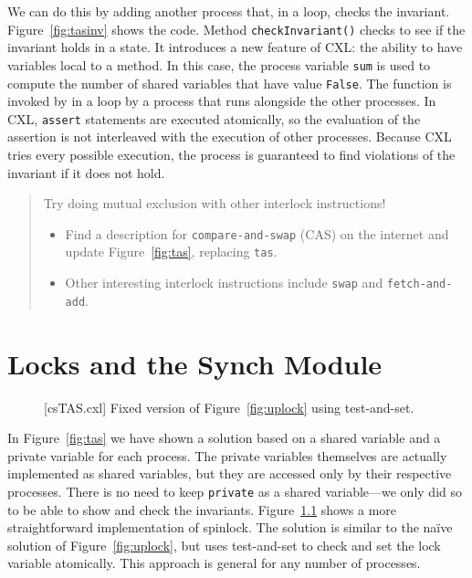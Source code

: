 \documentclass{report}
\newenvironment{code}{
\tcolorbox
}{
\endtcolorbox
}
\begin{document}
We can do this by adding another process that, in a loop,
checks the invariant.  Figure~\ref{fig:tasinv} shows the code.
Method \texttt{checkInvariant()} checks to see if the invariant holds
in a state.  It introduces a new feature of CXL: the ability to have
variables local to a method.  In this case, the process variable \texttt{sum}
is used to compute the number of shared variables that have value
\texttt{False}.
The function is invoked by in a loop by a process that runs alongside
the other processes.
In CXL, \texttt{assert} statements are executed atomically, so the
evaluation of the assertion is not interleaved with the execution
of other processes.
Because CXL tries every possible execution, the process is guaranteed
to find violations of the invariant if it does not hold.

\begin{quote}
Try doing mutual exclusion with other interlock instructions!
\begin{itemize}
\item Find a description for \texttt{compare-and-swap} (CAS)
on the internet and
update Figure~\ref{fig:tas}, replacing \texttt{tas}.
\item Other interesting interlock instructions include \texttt{swap} and
\texttt{fetch-and-add}.
\end{itemize}
\end{quote}

\chapter{Locks and the Synch Module}
\label{ch:synch}

\begin{figure}
\begin{code}
\end{code}
\caption{[csTAS.cxl] Fixed version of Figure~\ref{fig:uplock} using test-and-set.}
\label{fig:tas2}
\end{figure}

In Figure~\ref{fig:tas} we have shown a solution based on a shared
variable and a private variable for each process.   The private
variables themselves are actually implemented as shared variables,
but they are accessed only by their respective processes.
There is no need to keep \texttt{private} as a shared
variable---we only did so to be able to show and check the invariants.
Figure~\ref{fig:tas2} shows a more straightforward implementation of spinlock.
The solution is similar to the na\"{i}ve solution of Figure~\ref{fig:uplock},
but uses test-and-set to check and set the lock variable atomically.
This approach is general for any number of processes.
\end{document}
